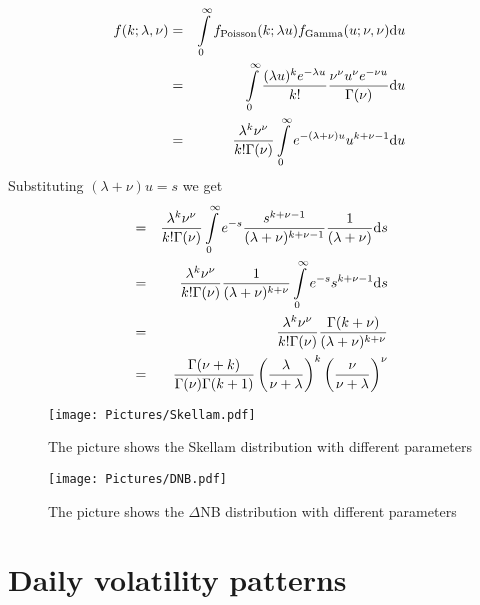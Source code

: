 \documentclass[12pt]{article}
\newcommand{\dd}{{\rm d}}
\begin{document}
 \begin{eqnarray}
f(k;\lambda,\nu)&=& \int \limits_{0}^{\infty} f_{\text{Poisson}}(k; \lambda u ) f_{\text{Gamma}}(u; \nu, \nu) \dd u \nonumber \\
&=&  \int \limits_{0}^{\infty} \frac{(\lambda u)^k e^{-\lambda u}}{k!} \frac{\nu^\nu u^{\nu} e^{-\nu u}}{ \Gamma(\nu)} \dd u \nonumber \\
&=&  \frac{\lambda^k \nu^{\nu}}{k! \Gamma(\nu)} \int \limits_{0}^{\infty}
 e^{-(\lambda+\nu)u} u^{k+\nu-1}
\dd u \nonumber 
\end{eqnarray}
Substituting $(\lambda+\nu)u=s$ we get 
 \begin{eqnarray}
&=& \frac{\lambda^k \nu^{\nu}}{k! \Gamma(\nu)} \int \limits_{0}^{\infty}
 e^{-s} \frac{s^{k+\nu-1}}{(\lambda+\nu)^{k+\nu-1}} \frac{1}{(\lambda+\nu)}
\dd s \nonumber \\
&=&  \frac{\lambda^k \nu^{\nu}}{k! \Gamma(\nu)}  \frac{1}{(\lambda+\nu)^{k+\nu}}\int \limits_{0}^{\infty}
 e^{-s} s^{k+\nu-1}
\dd s \nonumber \\ 
&=&    \frac{\lambda^k \nu^{\nu}}{k! \Gamma(\nu)}  \frac{\Gamma(k+\nu)}{(\lambda+\nu)^{k+\nu}}
\nonumber \\  
&=&  \frac{\Gamma(\nu+k)}{\Gamma(\nu)\Gamma(k+1)} \left(\frac{\lambda}{\nu+\lambda} \right)^{k} \left(\frac{\nu}{\nu+\lambda} \right)^{\nu}   \nonumber \\ 
\end{eqnarray} 
\begin{figure}[!htp]
  \centering 
\texttt{[image: Pictures/Skellam.pdf]}
       \caption{ The picture shows the Skellam distribution with different parameters }
 \label{c_pic:skellam_pic}
 \end{figure} 
 
\begin{figure}[!htp]
  \centering 
\texttt{[image: Pictures/DNB.pdf]}
       \caption{ The picture shows the $\Delta$NB distribution with different parameters }
 \label{c_pic:dnb_pic}
 \end{figure}  

\section{Daily volatility patterns}
\label{c_sec:spline_appendix}
\end{document}

